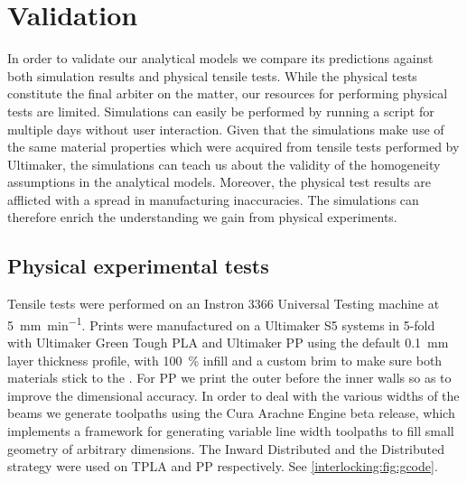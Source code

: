 \section{Validation}\label{interlocking:sec:validation}
In order to validate our analytical models we compare its predictions against both simulation results and physical tensile tests.
While the physical tests constitute the final arbiter on the matter,
our resources for performing physical tests are limited.
Simulations can easily be performed by running a script for multiple days without user interaction.
Given that the simulations make use of the same material properties which were acquired from tensile tests performed by Ultimaker,
the simulations can teach us about the validity of the homogeneity assumptions in the analytical models.
Moreover, the physical test results are afflicted with a spread in manufacturing inaccuracies.
The simulations can therefore enrich the understanding we gain from physical experiments.







\subsection{Physical experimental tests}
Tensile tests were performed on an Instron 3366 Universal Testing machine at \SI{5}{\milli\meter\per\minute}.
Prints were manufactured on a Ultimaker S5 systems in 5-fold with Ultimaker Green Tough PLA and Ultimaker PP using the default \SI{0.1}{\milli\meter} layer thickness profile,
with \SI{100}{\percent} infill and a custom brim to make sure both materials stick to the .
For PP we print the outer before the inner walls so as to improve the dimensional accuracy. %
In order to deal with the various widths of the beams we generate toolpaths using the Cura Arachne Engine beta release\cite{CuraArachne},
which implements a framework for generating variable line width toolpaths to fill small geometry of arbitrary dimensions\cite{Kuipers2020}.
The Inward Distributed and the Distributed strategy were used on TPLA and PP respectively.
See \cref{interlocking:fig:gcode}.



